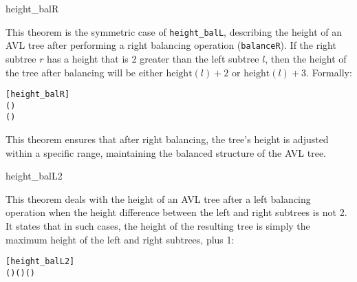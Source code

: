 \begin{thm}{height\_balR}

This theorem is the symmetric case of \texttt{height\_balL}, describing the height of an AVL tree after performing a right balancing operation (\texttt{balanceR}). If the right subtree \(r\) has a height that is 2 greater than the left subtree \(l\), then the height of the tree after balancing will be either \(\text{height}(l) + 2\) or \(\text{height}(l) + 3\). Formally:


\begin{alltt}
	[height_balR]
	\HOLTokenTurnstile{}   \HOLSymConst{=}   \HOLSymConst{\ensuremath{+}}  \HOLSymConst{\HOLTokenConj{}}   \HOLSymConst{\HOLTokenConj{}}   \HOLSymConst{\HOLTokenImp{}}
    (    ) \HOLSymConst{=}   \HOLSymConst{\ensuremath{+}}  \HOLSymConst{\HOLTokenDisj{}}
    (    ) \HOLSymConst{=}   \HOLSymConst{\ensuremath{+}} 
\end{alltt}

\end{thm}

This theorem ensures that after right balancing, the tree's height is adjusted within a specific range, maintaining the balanced structure of the AVL tree.


\begin{thm}{height\_balL2}

This theorem deals with the height of an AVL tree after a left balancing operation when the height difference between the left and right subtrees is not 2. It states that in such cases, the height of the resulting tree is simply the maximum height of the left and right subtrees, plus 1:


\begin{alltt}
	[height_balL2]
	\HOLTokenTurnstile{}   \HOLSymConst{\HOLTokenConj{}}   \HOLSymConst{\HOLTokenConj{}}   \HOLSymConst{\HOLTokenNotEqual{}}   \HOLSymConst{\ensuremath{+}}  \HOLSymConst{\HOLTokenImp{}}
    (    ) \HOLSymConst{=}  \HOLSymConst{\ensuremath{+}}  ( ) ( )
\end{alltt}

\end{thm}

